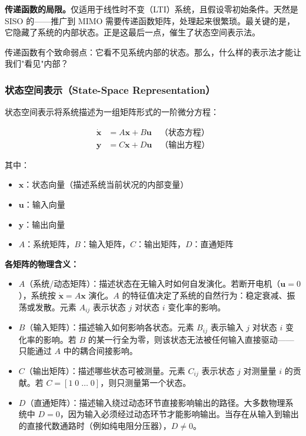 \textbf{传递函数的局限。}\;仅适用于线性时不变（LTI）系统，且假设零初始条件。天然是 SISO 的——推广到 MIMO 需要传递函数矩阵，处理起来很繁琐。最关键的是，它隐藏了系统的内部状态。正是这最后一点，催生了状态空间表示法。

传递函数有个致命弱点：它看不见系统内部的状态。那么，什么样的表示法才能让我们"看见"内部？

\subsubsection{状态空间表示（State-Space Representation）}

状态空间表示将系统描述为一组矩阵形式的一阶微分方程：

\begin{align}
\dot{\mathbf{x}} &= A\mathbf{x} + B\mathbf{u} \quad \text{（状态方程）} \\
\mathbf{y} &= C\mathbf{x} + D\mathbf{u} \quad \text{（输出方程）}
\end{align}

其中：
\begin{itemize}[nosep]
    \item $\mathbf{x}$：状态向量（描述系统当前状况的内部变量）
    \item $\mathbf{u}$：输入向量
    \item $\mathbf{y}$：输出向量
    \item $A$：系统矩阵，$B$：输入矩阵，$C$：输出矩阵，$D$：直通矩阵
\end{itemize}

\textbf{各矩阵的物理含义：}
\begin{itemize}
    \item $A$（系统/动态矩阵）：描述状态在无输入时如何自发演化。若断开电机（$\mathbf{u} = 0$），系统按 $\dot{\mathbf{x}} = A\mathbf{x}$ 演化。$A$ 的特征值决定了系统的自然行为：稳定衰减、振荡或发散。元素 $A_{ij}$ 表示状态 $j$ 对状态 $i$ 变化率的影响。
    \item $B$（输入矩阵）：描述输入如何影响各状态。元素 $B_{ij}$ 表示输入 $j$ 对状态 $i$ 变化率的影响。若 $B$ 的某一行全为零，则该状态无法被任何输入直接驱动——只能通过 $A$ 中的耦合间接影响。
    \item $C$（输出矩阵）：描述哪些状态可被测量。元素 $C_{ij}$ 表示状态 $j$ 对测量量 $i$ 的贡献。若 $C = [1\;0\;\ldots\;0]$，则只测量第一个状态。
    \item $D$（直通矩阵）：描述输入绕过动态环节直接影响输出的路径。大多数物理系统中 $D = 0$，因为输入必须经过动态环节才能影响输出。当存在从输入到输出的直接代数通路时（例如纯电阻分压器），$D \neq 0$。
\end{itemize}

